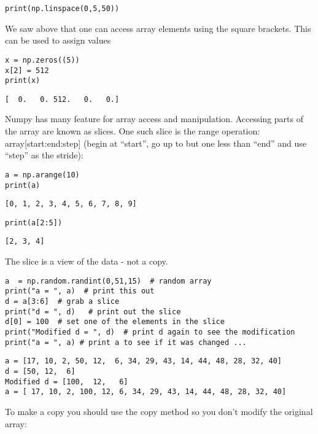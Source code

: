 \begin{verbatim}
print(np.linspace(0,5,50))
\end{verbatim}

We saw above that one can access array elements using the square
brackets. This can be used to assign values

\begin{verbatim}
x = np.zeros((5))
x[2] = 512
print(x)
\end{verbatim}

\begin{verbatim}
[  0.   0. 512.   0.   0.]
\end{verbatim}

Numpy has many feature for array access and manipulation. Accessing
parts of the array are known as slices. One such slice is the range
operation: array{[}start:end:step{]} (begin at ``start'', go up to but
one less than ``end'' and use ``step'' as the stride):

\begin{verbatim}
a = np.arange(10)
print(a)
\end{verbatim}

\begin{verbatim}
[0, 1, 2, 3, 4, 5, 6, 7, 8, 9]
\end{verbatim}

\begin{verbatim}
print(a[2:5])
\end{verbatim}

\begin{verbatim}
[2, 3, 4]
\end{verbatim}

The slice is a view of the data - not a copy.

\begin{verbatim}
a  = np.random.randint(0,51,15)  # random array
print("a = ", a)  # print this out
d = a[3:6]  # grab a slice
print("d = ", d)   # print out the slice
d[0] = 100  # set one of the elements in the slice
print("Modified d = ", d)  # print d again to see the modification
print("a = ", a) # print a to see if it was changed ...
\end{verbatim}

\begin{verbatim}
a = [17, 10, 2, 50, 12,  6, 34, 29, 43, 14, 44, 48, 28, 32, 40]
d = [50, 12,  6]
Modified d = [100,  12,   6]
a = [ 17, 10, 2, 100, 12, 6, 34, 29, 43, 14, 44, 48, 28, 32, 40]
\end{verbatim}

To make a copy you should use the copy method so you don't modify the
original array:

